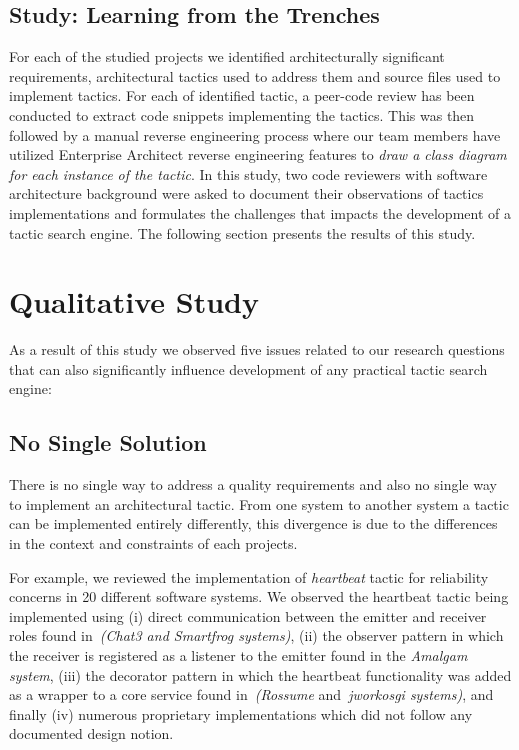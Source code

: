 \subsection{Study: Learning from the Trenches}
For each of the studied projects we identified architecturally significant requirements, architectural tactics used to address them and source files used to implement tactics.
For each of identified tactic, a peer-code review has been conducted to extract code snippets implementing the tactics. This was then followed by a manual reverse engineering process where our team members have utilized Enterprise Architect reverse engineering features to \textit{draw a class diagram for each instance of the tactic}. In this study, two code reviewers with software architecture background were asked to document their observations of tactics implementations and formulates the challenges that impacts the development of a tactic search engine. 
The following section presents the results of this study.
\section{Qualitative Study}
\label{sec:SeenUnSeen}
As a result of this study we observed five issues related to our research questions that can also significantly influence development of any practical tactic search engine:

\subsection{No Single Solution}
There is no single way to address a quality requirements and also no single way to implement an architectural tactic. From one system to another system a tactic can be implemented entirely differently, this divergence is due to the differences in the context and constraints of each projects.

For example, we reviewed the implementation of \emph{heartbeat} tactic for reliability concerns in 20 different software systems. We observed the heartbeat tactic being implemented using (i) direct communication between the emitter and receiver roles found in~\emph{(Chat3 and Smartfrog systems)}, (ii) the observer pattern in which the receiver is registered as a listener to the emitter found in the \emph{Amalgam system}, (iii) the decorator pattern in which the heartbeat functionality was added as a wrapper to a core service found in~\emph{(Rossume} and~\emph{jworkosgi systems)}, and finally (iv) numerous proprietary implementations which did not follow any documented design notion.

